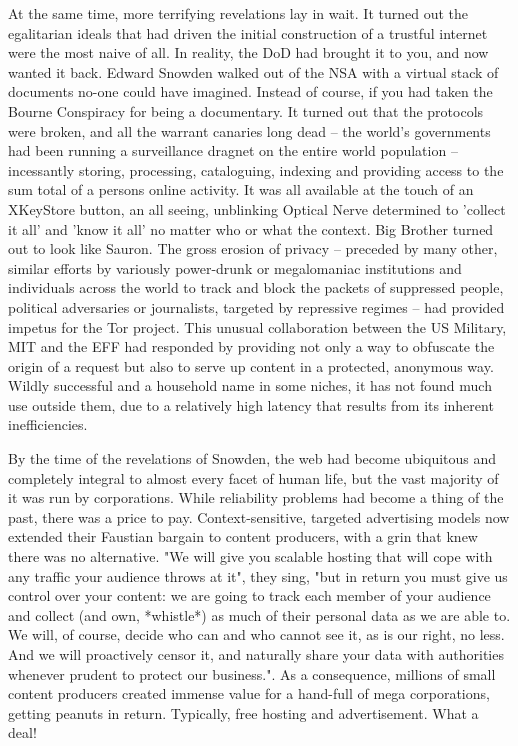 At the same time, more terrifying revelations lay in wait. It turned out the egalitarian ideals that had driven the initial construction of a trustful internet were the most naive of all. In reality, the DoD had brought it to you, and now wanted it back. Edward Snowden walked out of the NSA with a virtual stack of documents no-one could have imagined. Instead of course, if you had taken the Bourne Conspiracy for being a documentary. It turned out that the protocols were broken, and all the warrant canaries long dead -- the world's governments had been running a surveillance dragnet on the entire world population -- incessantly storing, processing, cataloguing, indexing and providing access to the sum total of a persons online activity. It was all available at the touch of an XKeyStore button, an all seeing, unblinking Optical Nerve determined to 'collect it all' and 'know it all' no matter who or what the context. Big Brother turned out to look like Sauron.
The gross erosion of privacy – preceded by many other, similar efforts by variously power-drunk or megalomaniac institutions and individuals across the world to track and block the packets of suppressed people, political adversaries or journalists, targeted by repressive regimes – had provided impetus for the Tor project. This unusual collaboration between the US Military, MIT and the EFF had responded by providing not only a way to obfuscate the origin of a request but also to serve up content in a protected, anonymous way. Wildly successful and a household name in some niches, it has not found much use outside them, due to a relatively high latency that results from its inherent inefficiencies.

By the time of the revelations of Snowden, the web had become ubiquitous and completely integral to almost every facet of human life, but the vast majority of it was run by corporations. While reliability problems had become a thing of the past, there was a price to pay. Context-sensitive, targeted advertising models now extended their Faustian bargain to content producers, with a grin that knew there was no alternative. "We will give you scalable hosting that will cope with any traffic your audience throws at it", they sing, "but in return you must give us control over your content: we are going to track each member of your audience and collect (and own, *whistle*) as much of their personal data as we are able to. We will, of course, decide who can and who cannot see it, as is our right, no less. And we will proactively censor it, and  naturally share your data with authorities whenever prudent to protect our business.". As a consequence, millions of small content producers created immense value for a hand-full of mega corporations, getting peanuts in return. Typically, free hosting and advertisement. What a deal!

